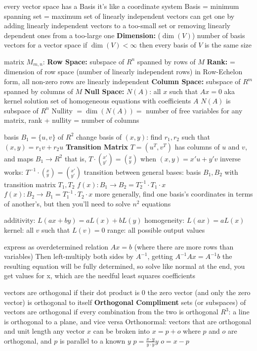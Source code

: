 \documentclass[12pt]{article}
\begin{document}
\begin{multicols*}{2}
\begin{flushleft}
\begin{outline}[longenum]
  \1 every vector space has a Basis
  \1 it's like a coordinate system
  \1 Basis = minimum spanning set = maximum set of linearly independent vectors
  \1 can get one by adding linearly independent vectors to a too-small set or removing linearly dependent ones from a too-large one
  \1 \textbf{Dimension:} ($\dim(V)$) number of basis vectors for a vector space
    \2 if $\dim(V)<\infty$ then every basis of $V$ is the same size

  \1 matrix $M_{m,n}$:
  \1 \textbf{Row Space:} subspace of $R^n$ spanned by rows of $M$
    \2 \textbf{Rank:} = dimension of row space (number of linearly independent rows)
    \2 in Row-Echelon form, all non-zero rows are linearly independent
  \1 \textbf{Column Space:} subspace of $R^m$ spanned by columns of $M$
  \1 \textbf{Null Space:} $N(A)$: all $x$ such that $Ax=0$
    \2 aka kernel
    \2 solution set of homogeneous equations with coefficients $A$
    \2 $N(A)$ is subspace of $R^n$
    \2 Nullity $=\dim(N(A))=$ number of free variables
  \1 for any matrix, rank + nullity = number of columns

  \1 basis $B_1=\{u,v\}$ of $R^2$
  \1 change basis of $(x,y)$: find $r_1,r_2$ such that $(x,y) = r_1v + r_2u$
  \1 \textbf{Transition Matrix} $T=(u^T,v^T)$ has columns of $u$ and $v$, and maps $B_1\rightarrow R^2$
    \2 that is, $T\cdot(^{x'}_{y'}) = (^x_y)$ when $(x,y)=x'u+y'v$
    \2 inverse works: $T^{-1}\cdot(^x_y) = (^{x'}_{y'})$
  \1 transition between general bases:
    \2 basis $B_1,B_2$ with transition matrix $T_1,T_2$
    \2 $f(x): B_1 \rightarrow B_2 = T_2^{-1}\cdot T_1 \cdot x $
    \2 $f(x): B_2 \rightarrow B_1 = T_1^{-1}\cdot T_2 \cdot x $
    \2 more generally, find one basis's coordinates in terms of another's, but then you'll need to solve $n^2$ equations

  \1 additivity:  $L(ax+by) = aL(x)+bL(y)$
  \1 homogeneity: $L(ax) = aL(x)$
  \1 kernel: all $v$ such that $L(v)=0$
  \1 range: all possible output values

  \1 express as overdetermined relation $Ax = b$ (where there are more rows than variables)
  \1 Then left-multiply both sides by $A^{-1}$, getting $A^{-1}Ax=A^{-1}b$
  \1 the resulting equation will be fully determined, so solve like normal
  \1 at the end, you get values for x, which are the needful least squares coefficients

  \1 vectors are orthogonal if their dot product is 0
    \2 the zero vector (and only the zero vector) is orthogonal to itself
  \1 \textbf{Orthogonal Compliment} sets (or subspaces) of vectors are orthogonal if every combination from the two is orthogonal
    \2 $R^3$: a line is orthogonal to a plane, and vice versa
  \1 Orthonormal: vectors that are orthogonal and unit length
  \1 any vector $x$ can be broken into $x=p+o$ where $p$ and $o$ are orthogonal, and $p$ is parallel to a known $y$
    \2 $p = \frac{x\cdot y}{y\cdot y}y$
    \2 $o = x - p$

\end{outline}
\end{flushleft}
\end{multicols*}
\end{document}
